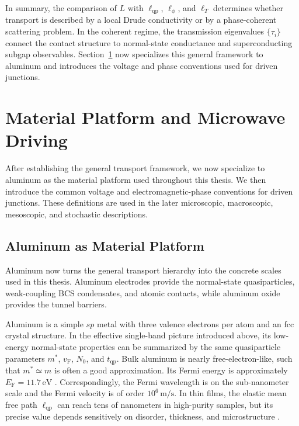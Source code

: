     In summary, the comparison of $L$ with $\ell_\mathrm{qp}$, $\ell_\phi$, and $\ell_T$ determines whether transport is described by a local Drude conductivity or by a phase-coherent scattering problem. In the coherent regime, the transmission eigenvalues $\{\tau_i\}$ connect the contact structure to normal-state conductance and superconducting subgap observables. Section~\ref{sec:basics:platform-drive} now specializes this general framework to aluminum and introduces the voltage and phase conventions used for driven junctions.


\newpage
\section{Material Platform and Microwave Driving}
\label{sec:basics:platform-drive}

    After establishing the general transport framework, we now specialize to aluminum as the material platform used throughout this thesis. We then introduce the common voltage and electromagnetic-phase conventions for driven junctions. These definitions are used in the later microscopic, macroscopic, mesoscopic, and stochastic descriptions.

    \subsection{Aluminum as Material Platform}
    \label{subsec:basics:aluminum}

        Aluminum now turns the general transport hierarchy into the concrete scales used in this thesis. Aluminum electrodes provide the normal-state quasiparticles, weak-coupling BCS condensates, and atomic contacts, while aluminum oxide provides the tunnel barriers.

        Aluminum is a simple $sp$ metal with three valence electrons per atom and an fcc crystal structure. In the effective single-band picture introduced above, its low-energy normal-state properties can be summarized by the same quasiparticle parameters $m^\ast$, $v_\mathrm{F}$, $N_0$, and $t_\mathrm{qp}$. Bulk aluminum is nearly free-electron-like, such that $m^\ast \simeq m$ is often a good approximation. Its Fermi energy is approximately $E_\mathrm{F} = 11.7\,\mathrm{eV}$ \cite{chauvin_josephson_2005}. Correspondingly, the Fermi wavelength is on the sub-nanometer scale and the Fermi velocity is of order $10^6\,\mathrm{m/s}$. In thin films, the elastic mean free path $\ell_\mathrm{qp}$ can reach tens of nanometers in high-purity samples, but its precise value depends sensitively on disorder, thickness, and microstructure \cite{steinberg_quasi-particle_2008}.

